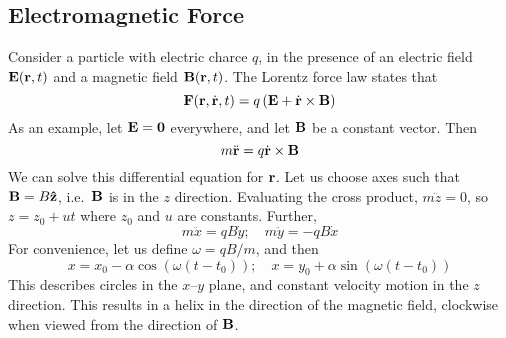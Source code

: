 \subsection{Electromagnetic Force}
Consider a particle with electric charce \(q\), in the presence of an electric field \(\vb E(\vb r, t)\) and a magnetic field \(\vb B(\vb r, t)\).
The Lorentz force law states that
\[
	\vb F(\vb r, \dot{\vb r}, t) = q\left( \vb E + \dot{\vb r} \times \vb B \right)
\]
As an example, let \(\vb E = \vb 0\) everywhere, and let \(\vb B\) be a constant vector.
Then
\[
	m \ddot{\vb r} = q \dot{\vb r} \times \vb B
\]
We can solve this differential equation for \(\vb r\).
Let us choose axes such that \(\vb B = B \vu{z}\), i.e.\ \(\vb B\) is in the \(z\) direction.
Evaluating the cross product, \(m \ddot{z} = 0\), so \(z = z_0 + ut\) where \(z_0\) and \(u\) are constants.
Further,
\[
	m \ddot x = qB\dot y;\quad m \ddot y = -qB\dot x
\]
For convenience, let us define \(\omega = qB/m\), and then
\[
	x = x_0 - \alpha \cos(\omega(t - t_0));\quad x = y_0 + \alpha \sin(\omega(t - t_0))
\]
This describes circles in the \(x\)--\(y\) plane, and constant velocity motion in the \(z\) direction.
This results in a helix in the direction of the magnetic field, clockwise when viewed from the direction of \(\vb B\).
